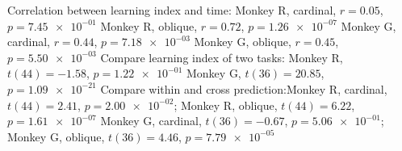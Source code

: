 Correlation between learning index and time: Monkey R, cardinal, $r = 0.05$, $p = \num{7.45e-01}$ 
Monkey R, oblique, $r = 0.72$, $p = \num{1.26e-07}$ 
Monkey G, cardinal, $r = 0.44$, $p = \num{7.18e-03}$ 
Monkey G, oblique, $r = 0.45$, $p = \num{5.50e-03}$ 
Compare learning index of two tasks: Monkey R, $t(44) = -1.58$, $p = \num{1.22e-01}$ 
Monkey G, $t(36) = 20.85$, $p = \num{1.09e-21}$ 
Compare within and cross prediction:Monkey R, cardinal, $t(44) = 2.41$, $p = \num{2.00e-02}$; 
Monkey R, oblique, $t(44) = 6.22$, $p = \num{1.61e-07}$ 
Monkey G, cardinal, $t(36) = -0.67$, $p = \num{5.06e-01}$; 
Monkey G, oblique, $t(36) = 4.46$, $p = \num{7.79e-05}$ 
